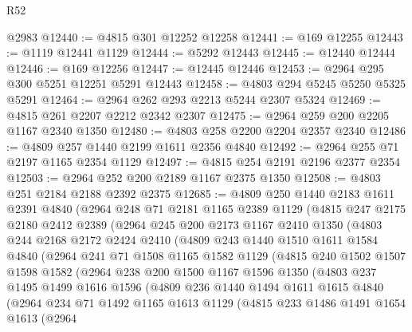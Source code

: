 \begin{lexlean}{R52}
\begin{coremodule}
    @2983
@12440 := @4815 @301 @12252 @12258
@12441 := @169 @12255
@12443 := @1119 @12441 @1129
@12444 := @5292 @12443
@12445 := @12440 @12444
@12446 := @169 @12256
@12447 := @12445 @12446
@12453 := @2964 @295 @300 @5251 @12251 @5291 @12443
@12458 := @4803 @294 @5245 @5250 @5325 @5291
@12464 := @2964 @262 @293 @2213 @5244 @2307 @5324
@12469 := @4815 @261 @2207 @2212 @2342 @2307
@12475 := @2964 @259 @200 @2205 @1167 @2340 @1350
@12480 := @4803 @258 @2200 @2204 @2357 @2340
@12486 := @4809 @257 @1440 @2199 @1611 @2356 @4840
@12492 := @2964 @255 @71 @2197 @1165 @2354 @1129
@12497 := @4815 @254 @2191 @2196 @2377 @2354
@12503 := @2964 @252 @200 @2189 @1167 @2375 @1350
@12508 := @4803 @251 @2184 @2188 @2392 @2375
@12685 := @4809
    @250
    @1440
    @2183
    @1611
    @2391
    @4840
    (@2964
      @248
      @71
      @2181
      @1165
      @2389
      @1129
      (@4815
        @247
        @2175
        @2180
        @2412
        @2389
        (@2964
          @245
          @200
          @2173
          @1167
          @2410
          @1350
          (@4803
            @244
            @2168
            @2172
            @2424
            @2410
            (@4809
              @243
              @1440
              @1510
              @1611
              @1584
              @4840
              (@2964
                @241
                @71
                @1508
                @1165
                @1582
                @1129
                (@4815
                  @240
                  @1502
                  @1507
                  @1598
                  @1582
                  (@2964
                    @238
                    @200
                    @1500
                    @1167
                    @1596
                    @1350
                    (@4803
                      @237
                      @1495
                      @1499
                      @1616
                      @1596
                      (@4809
                        @236
                        @1440
                        @1494
                        @1611
                        @1615
                        @4840
                        (@2964
                          @234
                          @71
                          @1492
                          @1165
                          @1613
                          @1129
                          (@4815
                            @233
                            @1486
                            @1491
                            @1654
                            @1613
                            (@2964

\end{coremodule}
\end{lexlean}
